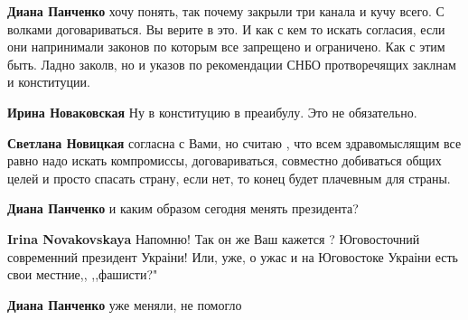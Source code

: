 \begin{itemize}
\begin{itemize}
\textbf{Диана Панченко} хочу понять, так почему закрыли три канала и кучу
всего. С волками договариваться. Вы верите в это. И как с кем то искать
согласия, если они напринимали законов по которым все запрещено и ограничено.
Как с этим быть. Ладно заколв, но и указов по рекомендации СНБО протворечящих
заклнам и конституции.

 
\textbf{Ирина Новаковская} Ну в конституцию в преаибулу. Это не обязательно.

 
\textbf{Светлана Новицкая} согласна с Вами, но считаю , что всем здравомыслящим
все равно надо искать компромиссы, договариваться, совместно добиваться общих
целей и просто спасать страну, если нет, то конец будет плачевным для страны.

 
\textbf{Диана Панченко} и каким образом сегодня менять президента?

 
\textbf{Irina Novakovskaya} Напомню! Так он же Ваш кажется ? Юговосточний
современний президент Украіни! Или, уже, о ужас и на Юговостоке Украіни есть
свои местние,, ,,фашисти?"

 
\textbf{Диана Панченко} уже меняли, не помогло


\end{itemize}
\end{itemize}
